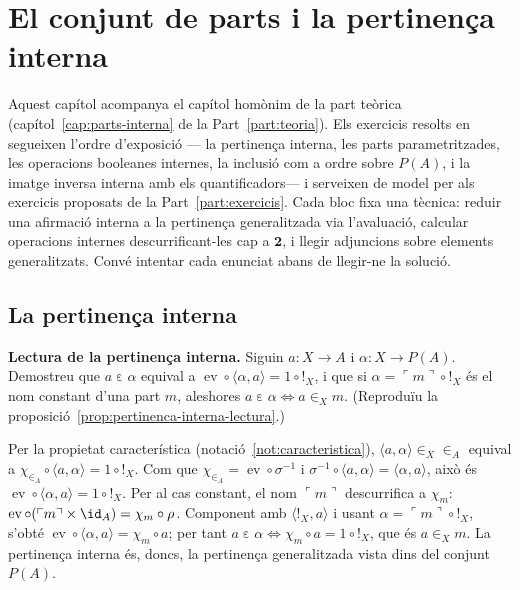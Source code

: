 \chapter{El conjunt de parts i la pertinença interna}\label{cap:practica-parts-interna}

Aquest capítol acompanya el capítol homònim de la part teòrica (capítol~\ref{cap:parts-interna} de la Part~\ref{part:teoria}). Els exercicis resolts en segueixen l'ordre d'exposició --- la pertinença interna, les parts parametritzades, les operacions booleanes internes, la inclusió com a ordre sobre \(P(A)\), i la imatge inversa interna amb els quantificadors--- i serveixen de model per als exercicis proposats de la Part~\ref{part:exercicis}. Cada bloc fixa una tècnica: reduir una afirmació interna a la pertinença generalitzada via l'avaluació, calcular operacions internes descurrificant-les cap a \(\mathbf2\), i llegir adjuncions sobre elements generalitzats. Convé intentar cada enunciat abans de llegir-ne la solució.

\section{La pertinença interna}\label{prac:pertinenca-interna}

\begin{exercici}
\textbf{Lectura de la pertinença interna.} Siguin \(a\colon X\to A\) i \(\alpha\colon X\to P(A)\). Demostreu que \(a\mathrel{\varepsilon}\alpha\) equival a \(\operatorname{ev}\circ\langle\alpha,a\rangle=1\circ{!}_X\), i que si \(\alpha=\ulcorner m\urcorner\circ{!}_X\) és el nom constant d'una part \(m\), aleshores \(a\mathrel{\varepsilon}\alpha\iff a\in_X m\). (Reproduïu la proposició~\ref{prop:pertinenca-interna-lectura}.)
\end{exercici}
\begin{solucio}
Per la propietat característica (notació~\ref{not:caracteristica}), \(\langle a,\alpha\rangle\in_X{\in_A}\) equival a \(\chi_{\in_A}\circ\langle a,\alpha\rangle=1\circ{!}_X\). Com que \(\chi_{\in_A}=\operatorname{ev}\circ\sigma^{-1}\) i \(\sigma^{-1}\circ\langle a,\alpha\rangle=\langle\alpha,a\rangle\), això és \(\operatorname{ev}\circ\langle\alpha,a\rangle=1\circ{!}_X\). Per al cas constant, el nom \(\ulcorner m\urcorner\) descurrifica a \(\chi_m\): \(\operatorname{ev}\circ(\ulcorner m\urcorner\times\id_A)=\chi_m\circ\rho\). Component amb \(\langle{!}_X,a\rangle\) i usant \(\alpha=\ulcorner m\urcorner\circ{!}_X\), s'obté \(\operatorname{ev}\circ\langle\alpha,a\rangle=\chi_m\circ a\); per tant \(a\mathrel{\varepsilon}\alpha\iff\chi_m\circ a=1\circ{!}_X\), que és \(a\in_X m\). La pertinença interna és, doncs, la pertinença generalitzada vista dins del conjunt \(P(A)\).
\end{solucio}

